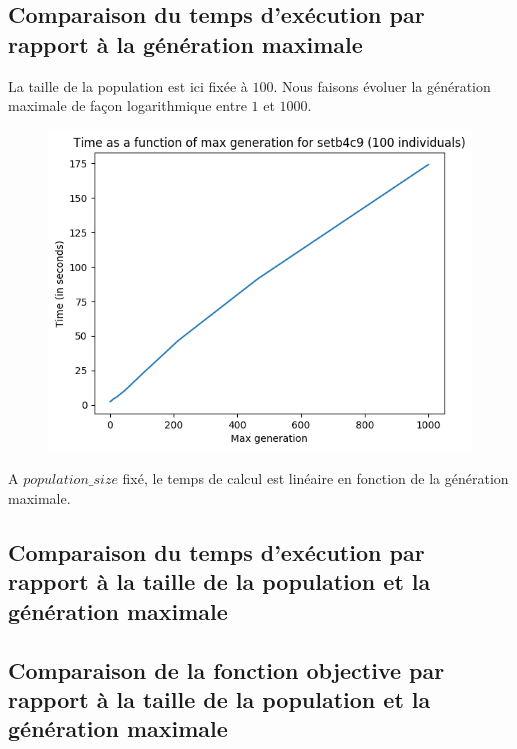 \subsection{Comparaison du temps d'exécution par rapport à la génération maximale}

La taille de la population est ici fixée à $100$. Nous faisons évoluer la génération maximale de façon logarithmique entre $1$ et $1000$.

\begin{figure}[!h]
    \centering
    \includegraphics[]{report/Pictures/setb4c9_benchmarks_generation.png}
\end{figure}

A $population\_size$ fixé, le temps de calcul est linéaire en fonction de la génération maximale.

\subsection{Comparaison du temps d'exécution par rapport à la taille de la population et la génération maximale}

\subsection{Comparaison de la fonction objective par rapport à la taille de la population et la génération maximale}